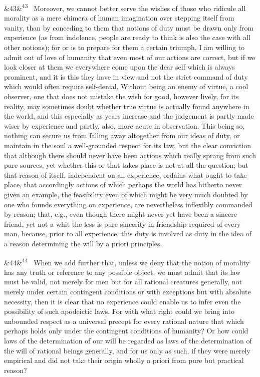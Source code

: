 \documentclass[12pt]{article}
\newcommand{\para}[1][]{\par\noindent\ifx&#1&\else\textsuperscript{\footnotesize #1}~\fi}
\begin{document}
\para[43] Moreover, we cannot better serve the wishes of those who ridicule all morality as a mere chimera of human imagination over stepping itself from vanity, than by conceding to them that notions of duty must be drawn only from experience (as from indolence, people are ready to think is also the case with all other notions); for or is to prepare for them a certain triumph. I am willing to admit out of love of humanity that even most of our actions are correct, but if we look closer at them we everywhere come upon the dear self which is always prominent, and it is this they have in view and not the strict command of duty which would often require self-denial. Without being an enemy of virtue, a cool observer, one that does not mistake the wish for good, however lively, for its reality, may sometimes doubt whether true virtue is actually found anywhere in the world, and this especially as years increase and the judgement is partly made wiser by experience and partly, also, more acute in observation. This being so, nothing can secure us from falling away altogether from our ideas of duty, or maintain in the soul a well-grounded respect for its law, but the clear conviction that although there should never have been actions which really sprang from such pure sources, yet whether this or that takes place is not at all the question; but that reason of itself, independent on all experience, ordains what ought to take place, that accordingly actions of which perhaps the world has hitherto never given an example, the feasibility even of which might be very much doubted by one who founds everything on experience, are nevertheless inflexibly commanded by reason; that, e.g., even though there might never yet have been a sincere friend, yet not a whit the less is pure sincerity in friendship required of every man, because, prior to all experience, this duty is involved as duty in the idea of a reason determining the will by a priori principles.

\para[44] When we add further that, unless we deny that the notion of morality has any truth or reference to any possible object, we must admit that its law must be valid, not merely for men but for all rational creatures generally, not merely under certain contingent conditions or with exceptions but with absolute necessity, then it is clear that no experience could enable us to infer even the possibility of such apodeictic laws. For with what right could we bring into unbounded respect as a universal precept for every rational nature that which perhaps holds only under the contingent conditions of humanity? Or how could laws of the determination of our will be regarded as laws of the determination of the will of rational beings generally, and for us only as such, if they were merely empirical and did not take their origin wholly a priori from pure but practical reason?
\end{document}
